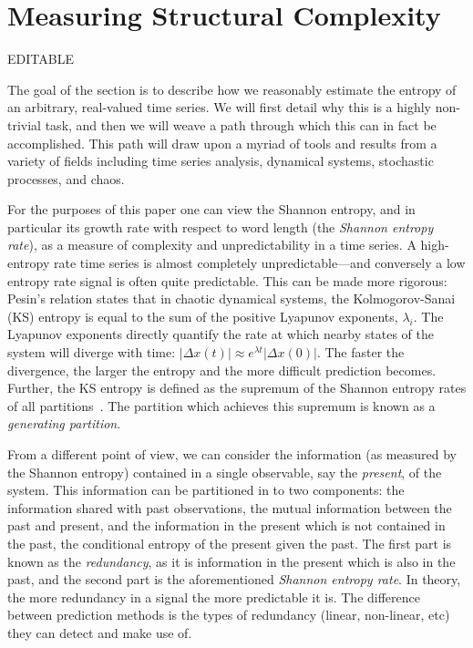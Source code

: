 \section{Measuring Structural Complexity }\label{sec:meaComplex}
{\color{blue} EDITABLE}

The goal of the section is to describe how we reasonably estimate the entropy of an arbitrary, real-valued time series. We will first detail why this is a highly non-trivial task, and then we will weave a path through which this can in fact be accomplished. This path will draw upon a myriad of tools and results from a variety of fields including time series analysis, dynamical systems, stochastic processes, and chaos.

For the purposes of this paper one can view the Shannon entropy, and in particular its growth rate  with respect to word length (the \emph{Shannon entropy rate}), as a measure of complexity and unpredictability in a time series. A high-entropy rate time series is almost completely unpredictable---and conversely a low entropy rate signal is often quite predictable. This can be made more rigorous: Pesin's relation \cite{pesin77} states that in chaotic dynamical systems, the Kolmogorov-Sanai (KS) entropy is equal to the sum of the positive Lyapunov exponents, $\lambda_i$. The Lyapunov exponents directly quantify the rate at which nearby states of the system will diverge with time: $\left| \Delta x(t) \right| \approx e^{\lambda t} \left| \Delta x(0) \right|$. The faster the divergence, the larger the entropy and the more difficult prediction becomes. Further, the KS entropy is defined as the supremum of the Shannon entropy rates of all partitions~\cite{petersen1989}. The partition which achieves this supremum is known as a \emph{generating partition}. 

From a different point of view, we can consider the information (as measured by the Shannon entropy) contained in a single observable, say the \emph{present}, of the system. This information can be partitioned in to two components: the information shared with past observations, the mutual information between the past and present, and the information in the present which is not contained in the past, the conditional entropy of the present given the past. The first part is known as the \emph{redundancy}, as it is information in the present which is also in the past, and the second part is the aforementioned \emph{Shannon entropy rate}. In theory, the more redundancy in a signal the more predictable it is. The difference between prediction methods is the types of redundancy (linear, non-linear, etc) they can detect and make use of.

